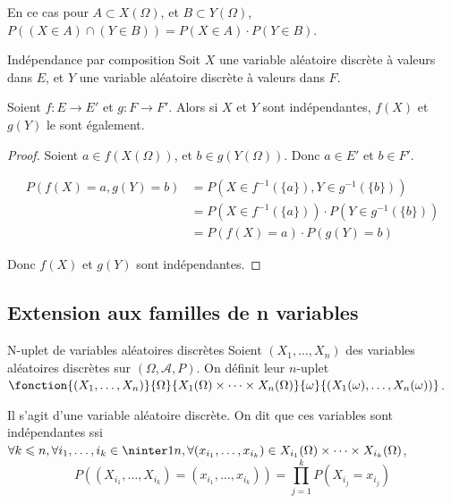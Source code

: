 \begin{corollaire}{}{}
    En ce cas pour $A \subset X(\Omega)$, et $B \subset Y(\Omega)$,
    $P((X \in A) \cap (Y \in B)) = P(X \in A) \cdot P(Y \in B)$.
\end{corollaire}

\begin{proposition}{Indépendance par composition}{}
    Soit $X$ une variable aléatoire discrète à valeurs dans $E$, et 
    $Y$ une variable aléatoire discrète à valeurs dans $F$. 

    Soient $f : E \to E'$ et $g : F \to F'$. Alors si $X$ et $Y$ sont indépendantes,
    $f(X)$ et $g(Y)$ le sont également.
\end{proposition}

\begin{proof}
    Soient $a \in f(X(\Omega))$, et $b \in g(Y(\Omega))$. Donc $a \in E'$ et $b \in F'$.

    \begin{align}
        P(f(X) = a, g(Y) = b) & = P(X \in f^{-1}(\{a\}), Y \in g^{-1}(\{b\})) \\
        & = P(X \in f^{-1}(\{a\})) \cdot P(Y \in g^{-1}(\{b\})) \\
        & = P(f(X) = a) \cdot P(g(Y) = b)
    \end{align}

    Donc $f(X)$ et $g(Y)$ sont indépendantes.
\end{proof}

\subsection{Extension aux familles de n variables }

\begin{proposition}{N-uplet de variables aléatoires discrètes}{}
    Soient $(X_1, \dots, X_n)$ des variables aléatoires discrètes sur 
    $(\Omega, \mathcal A, P)$. On définit leur $n$-uplet 
    $\fonction{(X_1, \dots, X_n)}{\Omega}{X_1(\Omega) \times \cdots \times X_n(\Omega)}{\omega}{(X_1(\omega), \dots, X_n(\omega))}$.

    Il s'agit d'une variable aléatoire discrète. On dit que ces variables sont indépendantes 
    ssi $\forall k \leqslant n, \forall i_1, \dots, i_k \in \ninter 1 n, \forall (x_{i_1}, \dots, x_{i_k}) \in X_{i_1}(\Omega) \times \cdots \times X_{i_k}(\Omega)$,
    $$ P((X_{i_1}, \dots, X_{i_k}) = (x_{i_1}, \dots, x_{i_k})) = \prod_{j = 1}^k P(X_{i_j} = x_{i_j})$$
\end{proposition}

